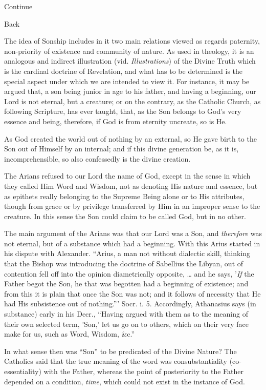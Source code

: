 Continue

Back


The idea of Sonship includes in it two main
relations viewed as regards paternity, non-priority of existence and
community of nature. As used in theology, it is an analogous and
indirect illustration (vid. \emph{Illustrations}) of the Divine Truth
which is the cardinal doctrine of Revelation, and what has to be
determined is the special aspect under which we are intended to view
it. For instance, it may be argued that, a son being junior in age to
his father, and having a beginning, our Lord is not eternal, but a
creature; or on the contrary, as the Catholic Church, as following
Scripture, has ever taught, that, as the Son belongs to God's very
essence and being, therefore, if God is from eternity uncreate, so is
He.

As God created the world out of nothing by an
external, so He gave birth to the Son out of Himself by an internal;
and if this divine generation be, as it is, incomprehensible, so also
confessedly is the divine creation.

The Arians refused to our Lord the name of God,
except in the sense in which they called Him Word and Wisdom, not as
denoting His nature and essence, but as epithets really belonging to
the Supreme Being alone or to His attributes, though from grace or by
privilege transferred by Him in an improper sense to the creature. In
this sense the Son could claim to be called God, but in no other.

The main argument of the Arians was that our Lord
was a Son, and \emph{therefore} was not eternal, but of a substance
which had a beginning. With this Arius started in his dispute with
Alexander. ``Arius, a man not without dialectic skill, thinking that
the Bishop was introducing the doctrine of Sabellius the Libyan, out
of contention fell off into the opinion diametrically opposite, …
and he says, '\emph{If} the Father begot the Son, he that was begotten
had a beginning of existence; and from this it is plain that once the
Son was not; and it follows of necessity that He had His subsistence
out of nothing.''' Socr. i. 5. Accordingly, Athanasius says (in
substance) early in his Decr., ``Having argued with them as to the
meaning of their own selected term, 'Son,' let us go on to others,
which on their very face make for us, such as Word, Wisdom,
\&c.''

In what sense then was ``Son'' to be predicated of
the Divine Nature? The Catholics said that the true meaning of
the word was consubstantiality (co-essentiality) with the Father,
whereas the point of posteriority to the Father depended on a
condition, \emph{time}, which could not exist in the instance of God.

